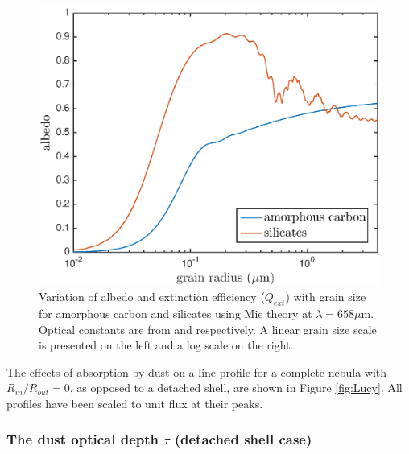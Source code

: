\documentclass[useAMS,usenatbib,usegraphicx]{mnras}
\begin{document}
\begin{figure}
\begin{center}
\includegraphics[trim =33 10 45 15,clip=true,scale=0.41]{albedo_grainsize_upto4_log}
\caption{Variation of albedo and extinction efficiency ($Q_{ext}$) with grain size for amorphous carbon and silicates using Mie theory at $\lambda = 658 \mu $m. Optical constants are from \citet{Zubko1996} and \citet{Draine1984} respectively. A linear grain size scale is presented on the left and a log scale on the right.}
\label{albedo_grain}
\end{center}
\end{figure}

The effects of absorption by dust on a line profile for a complete nebula with $R_{in}/R_{out}=0$, as opposed 
to a detached shell, are shown in Figure \ref{fig:Lucy}.  
All profiles have been scaled to unit flux at their peaks.



\subsubsection{The dust optical depth $\tau$ (detached shell case)}
\label{tau}
\end{document}
